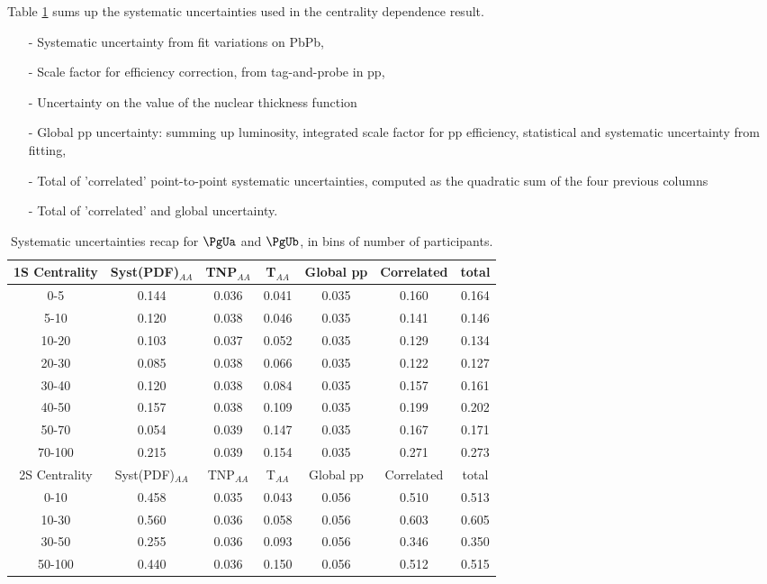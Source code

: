 Table \ref{tab:breakdownPart} sums up the systematic uncertainties
used in the centrality dependence result.
\begin{itemize}
\item[-] Systematic uncertainty from fit variations on PbPb,
\item[-] Scale factor for efficiency correction, from tag-and-probe in
  pp,
\item[-] Uncertainty on the value of the nuclear thickness function
\item[-] Global pp uncertainty: summing up luminosity, integrated
  scale factor for pp efficiency, statistical and systematic
  uncertainty from fitting,
\item[-] Total of 'correlated' point-to-point
  systematic uncertainties, computed as the quadratic sum of the four
  previous columns
\item[-] Total of 'correlated' and global uncertainty.
\end{itemize}
\begin{table}[hbtp]
  \begin{centering}
    \begin{tabular}{|c|c|c|c|c|c|c|}
      \hline
      1S Centrality & Syst(PDF)$_{AA}$ & TNP$_{AA}$ & T$_{AA}$ &
      Global pp & Correlated & total\\
      \hline
      0-5   &0.144 &0.036 &0.041 &0.035 &0.160 &0.164 \\
      5-10  &0.120 &0.038 &0.046 &0.035 &0.141 &0.146 \\
      10-20 &0.103 &0.037 &0.052 &0.035 &0.129 &0.134\\
      20-30 &0.085 &0.038 &0.066 &0.035 &0.122 &0.127\\
      30-40 &0.120 &0.038 &0.084 &0.035 &0.157 &0.161\\
      40-50 &0.157 &0.038 &0.109 &0.035 &0.199 &0.202\\
      50-70 &0.054 &0.039 &0.147 &0.035 &0.167 &0.171\\
      70-100&0.215 &0.039 &0.154 &0.035 &0.271 &0.273\\
      \hline
      2S Centrality & Syst(PDF)$_{AA}$ & TNP$_{AA}$ & T$_{AA}$ &
      Global pp & Correlated & total\\
      \hline
     0-10 &  0.458 &0.035 &0.043 &0.056 &0.510 &0.513 \\
     10-30 & 0.560 &0.036 &0.058 &0.056 &0.603 &0.605 \\
     30-50 & 0.255 &0.036 &0.093 &0.056 &0.346 &0.350 \\
     50-100 &0.440 &0.036 &0.150 &0.056 &0.512 &0.515 \\
      \hline
    \end{tabular}
    \caption{Systematic uncertainties recap for $\PgUa$ and $\PgUb$, in
      bins of number of participants. }  
    \label{tab:breakdownPart}
  \end{centering}
\end{table} 

